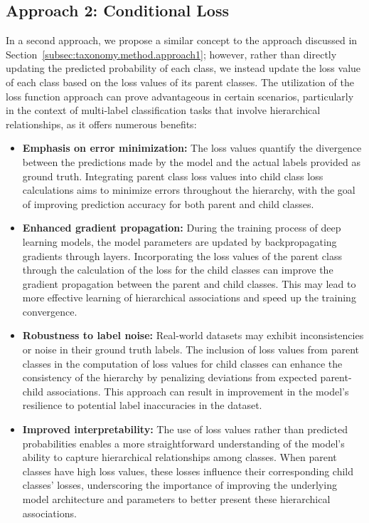 \documentclass[review,1p,times,numbers]{elsarticle}
\begin{document}
\subsection{Approach 2: Conditional Loss}\label{subsec:taxonomy.method.approach2}
In a second approach, we propose a similar concept to the approach discussed in Section~\ref{subsec:taxonomy.method.approach1}; however, rather than directly updating the predicted probability of each class, we instead update the loss value of each class based on the loss values of its parent classes. The utilization of the loss function approach can prove advantageous in certain scenarios, particularly in the context of multi-label classification tasks that involve hierarchical relationships, as it offers numerous benefits:
\begin{itemize}
    \item \textbf{Emphasis on error minimization:} The loss values quantify the divergence between the predictions made by the model and the actual labels provided as ground truth. Integrating parent class loss values into child class loss calculations aims to minimize errors throughout the hierarchy, with the goal of improving prediction accuracy for both parent and child classes.
    \item \textbf{Enhanced gradient propagation:} During the training process of deep learning models, the model parameters are updated by backpropagating gradients through layers. Incorporating the loss values of the parent class through the calculation of the loss for the child classes can improve the gradient propagation between the parent and child classes. This may lead to more effective learning of hierarchical associations and speed up the training convergence.
    \item \textbf{Robustness to label noise:} Real-world datasets may exhibit inconsistencies or noise in their ground truth labels. The inclusion of loss values from parent classes in the computation of loss values for child classes can enhance the consistency of the hierarchy by penalizing deviations from expected parent-child associations. This approach can result in improvement in the model's resilience to potential label inaccuracies in the dataset.
    \item \textbf{Improved interpretability:} The use of loss values rather than predicted probabilities enables a more straightforward understanding of the model's ability to capture hierarchical relationships among classes. When parent classes have high loss values, these losses influence their corresponding child classes' losses, underscoring the importance of improving the underlying model architecture and parameters to better present these hierarchical associations.
\end{itemize}
\end{document}
